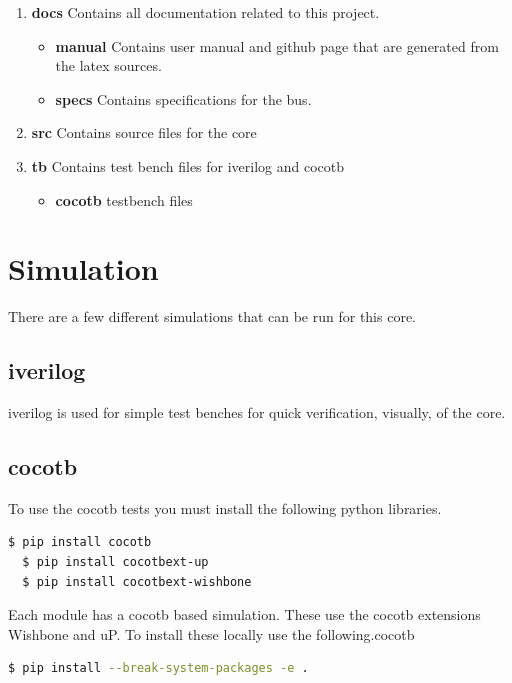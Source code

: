 \begin{enumerate}
  \item \textbf{docs} Contains all documentation related to this project.
    \begin{itemize}
      \item \textbf{manual} Contains user manual and github page that are generated from the latex sources.
      \item \textbf{specs} Contains specifications for the bus.
    \end{itemize}
  \item \textbf{src} Contains source files for the core
  \item \textbf{tb} Contains test bench files for iverilog and cocotb
    \begin{itemize}
      \item \textbf{cocotb} testbench files
    \end{itemize}
\end{enumerate}

\newpage

\section{Simulation}
\par
There are a few different simulations that can be run for this core.

\subsection{iverilog}
\par
iverilog is used for simple test benches for quick verification, visually, of the core.

\subsection{cocotb}
\par
To use the cocotb tests you must install the following python libraries.
\begin{lstlisting}[language=bash]
  $ pip install cocotb
  $ pip install cocotbext-up
  $ pip install cocotbext-wishbone
\end{lstlisting}

Each module has a cocotb based simulation. These use the cocotb extensions Wishbone and uP. To install
these locally use the following.cocotb
\begin{lstlisting}[language=bash]
  $ pip install --break-system-packages -e .
\end{lstlisting}

